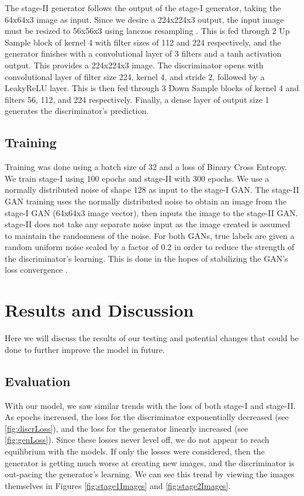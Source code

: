 \documentclass{article}
\begin{document}
	The stage-II generator follows the output of the stage-I generator, taking the 64x64x3 image as input. Since we desire a 224x224x3 output, the input image must be resized to 56x56x3 using lanczos resampling \cite{lanczos}. This is fed through 2 Up Sample block of kernel 4 with filter sizes of 112 and 224 respectively, and the generator finishes with a convolutional layer of 3 filters  and a tanh activation output. This provides a 224x224x3 image. The discriminator opens with convolutional layer of filter size 224, kernel 4, and stride 2, followed by a LeakyReLU layer. This is then fed through 3 Down Sample blocks of kernel 4 and filters 56, 112, and 224 respectively. Finally, a dense layer of output size 1 generates the discriminator’s prediction.

	\subsection{Training}
	Training was done using a batch size of 32 and a loss of Binary Cross Entropy. We train stage-I using 100 epochs and stage-II with 300 epochs. We use a normally distributed noise of shape 128 as input to the stage-I GAN. The stage-II GAN training uses the normally distributed noise to obtain an image from the stage-I GAN (64x64x3 image vector), then inputs the image to the stage-II GAN. stage-II does not take any separate noise input as the image created is assumed to maintain the randomness of the noise.  For both GANs, true labels are given a random uniform noise scaled by a factor of 0.2 in order to reduce the strength of the discriminator’s learning. This is done in the hopes of stabilizing the GAN’s loss convergence \cite{salimans2016improved}.
	\section{Results and Discussion}
	Here we will discuss the results of our testing and potential changes that could be done to further improve the model in future.

	\subsection{Evaluation}	
	\label{sub:eval}
	With our model, we saw similar trends with the loss of both stage-I and stage-II. As epochs increased, the loss for the discriminator exponentially decreased (see \ref{fig:discrLoss}), and the loss for the generator linearly increased (see \ref{fig:genLoss}). Since these losses never level off, we do not appear to reach equilibrium with the models. If only the losses were considered, then the generator is getting much worse at creating new images, and the discriminator is out-pacing the generator's learning. We can see this trend by viewing the images themselves in Figures \ref{fig:stage1Images} and \ref{fig:stage2Images}.
\end{document}
